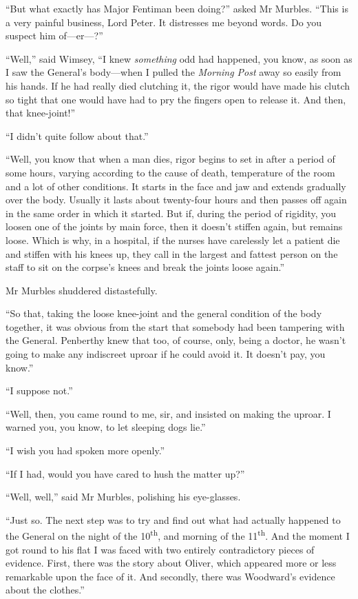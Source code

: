 \enquote{But what exactly has Major Fentiman been doing?} asked Mr Murbles. \enquote{This is a very painful business, Lord Peter. It distresses me beyond words. Do you suspect him of\allowbreak---\allowbreak er---?}

\enquote{Well,} said Wimsey, \enquote{I knew \textit{something} odd had happened, you know, as soon as I saw the General's body\allowbreak---\allowbreak when I pulled the \textit{Morning Post} away so easily from his hands. If he had really died clutching it, the rigor would have made his clutch so tight that one would have had to pry the fingers open to release it. And then, that knee-joint!}

\enquote{I didn't quite follow about that.}

\enquote{Well, you know that when a man dies, rigor begins to set in after a period of some hours, varying according to the cause of death, temperature of the room and a lot of other conditions. It starts in the face and jaw and extends gradually over the body. Usually it lasts about twenty-four hours and then passes off again in the same order in which it started. But if, during the period of rigidity, you loosen one of the joints by main force, then it doesn't stiffen again, but remains loose. Which is why, in a hospital, if the nurses have carelessly let a patient die and stiffen with his knees up, they call in the largest and fattest person on the staff to sit on the corpse's knees and break the joints loose again.}

Mr Murbles shuddered distastefully.

\enquote{So that, taking the loose knee-joint and the general condition of the body together, it was obvious from the start that somebody had been tampering with the General. Penberthy knew that too, of course, only, being a doctor, he wasn't going to make any indiscreet uproar if he could avoid it. It doesn't pay, you know.}

\enquote{I suppose not.}

\enquote{Well, then, you came round to me, sir, and insisted on making the uproar. I warned you, you know, to let sleeping dogs lie.}

\enquote{I wish you had spoken more openly.}

\enquote{If I had, would you have cared to hush the matter up?}

\enquote{Well, well,} said Mr Murbles, polishing his eye-glasses.

\enquote{Just so. The next step was to try and find out what had actually happened to the General on the night of the  10\textsuperscript{th}, and morning of the  11\textsuperscript{th}. And the moment I got round to his flat I was faced with two entirely contradictory pieces of evidence. First, there was the story about Oliver, which appeared more or less remarkable upon the face of it. And secondly, there was Woodward's evidence about the clothes.}

